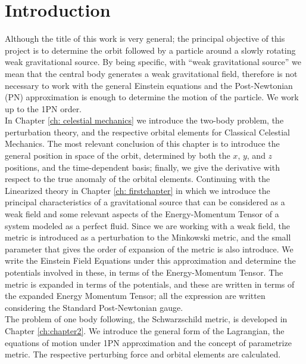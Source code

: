 \chapter*{Introduction}
Although the title of this work is very general; the principal objective of this project is to determine the orbit followed by a particle around a slowly rotating weak gravitational source. By being specific, with ``weak gravitational source'' we mean that the central body generates a weak gravitational field, therefore is not necessary to work with the general Einstein equations and the Post-Newtonian (PN) approximation is enough to determine the motion of the particle. We work up to the 1PN order. \cite{ GravityPoisson, Weinberg, Theoryandexperiments}\\

In Chapter \ref{ch: celestial mechanics} we introduce the two-body problem, the perturbation theory, and the respective orbital elements for Classical Celestial Mechanics. The most relevant conclusion of this chapter is to introduce the general position in space of the orbit, determined by both the $x$, $y$, and $z$ positions, and the time-dependent basis; finally, we give the derivative with respect to the true anomaly of the orbital elements. Continuing with the Linearized theory in Chapter \ref{ch: firstchapter} in which we introduce the principal characteristics of a gravitational source that can be considered as a weak field and some relevant aspects of the Energy-Momentum Tensor of a system modeled as a perfect fluid. Since we are working with a weak field, the metric is introduced as a perturbation to the Minkowski metric, and the small parameter that gives the order of expansion of the metric is also introduce. We write the Einstein Field Equations under this approximation and determine the potentials involved in these, in terms of the Energy-Momentum Tensor. The metric is expanded in terms of the potentials, and these are written in terms of the expanded Energy Momentum Tensor; all the expression are written considering the Standard Post-Newtonian gauge.\cite{GravityPoisson} \\

The problem of one body following, the Schwarzschild metric, is developed in Chapter \ref{ch:chapter2}. We introduce the general form of the Lagrangian, the equations of motion under 1PN approximation and the concept of parametrize metric. The respective perturbing force and orbital elements are calculated.\\

